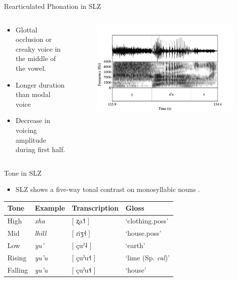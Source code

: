 \documentclass[professionalfonts]{beamer}
\providecommand{\lsptoprule}{\midrule\toprule}
\providecommand{\lspbottomrule}{\bottomrule\midrule}
\begin{document}
\begin{frame}{Rearticulated Phonation in SLZ}
  \begin{columns}
    \begin{column}{0.33\linewidth}
      \begin{itemize}
        \item Glottal occlusion or creaky voice in the middle of the vowel.
        \item Longer duration than modal voice
        \item Decrease in voicing amplitude during first half.
      \end{itemize}  
    \end{column}

    \begin{column}{0.67\linewidth}
      \begin{figure}
        \centering
        \includegraphics[width=\textwidth]{images/Spectrograms/xa'ag.png}
      \end{figure}
    \end{column}
  \end{columns}
\end{frame}

\begin{frame}{Tone in SLZ}
  \begin{itemize}
    \item SLZ shows a five-way tonal contrast on monosyllabic nouns \citep{brinkerhoffTonalPatternsTheir2022}.
  \end{itemize}
  \begin{center}
    \begin{tabular}{llll}
      \lsptoprule
      \textbf{Tone} & \textbf{Example} & \textbf{Transcription} & \textbf{Gloss} \\
      \midrule
      High    &  \textit{xha}   &  [ ʐa˦ ] & `clothing.poss'\\
      Mid     &  \textit{lhill} & [ ɾiʒ˧ ] & `house.poss' \\
      Low     &  \textit{yu'}   & [ çuˀ˨ ] & `earth'\\
      Rising  &  \textit{yu'u}  & [ çuˀu˧˦ ] & `lime (Sp. \textit{cal})' \\
      Falling &  \textit{yu'u}  & [ çuˀu˦˨ ] & `house' \\
      \lspbottomrule
    \end{tabular}
  \end{center}
\end{frame}
\end{document}
